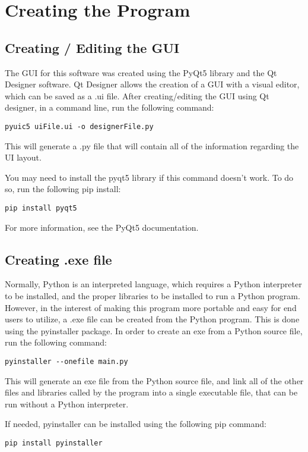 \documentclass{article}
\begin{document}
\section{Creating the Program}
\subsection{Creating / Editing the GUI}
The GUI for this software was created using the PyQt5 library and the Qt Designer software. Qt Designer allows the creation of a GUI with a visual editor, which can be saved as a .ui file. After creating/editing the GUI using Qt designer, in a command line, run the following command:
\begin{lstlisting}
pyuic5 uiFile.ui -o designerFile.py
\end{lstlisting}
This will generate a .py file that will contain all of the information regarding the UI layout. 

You may need to install the pyqt5 library if this command doesn't work. To do so, run the following pip install:
\begin{lstlisting}
pip install pyqt5
\end{lstlisting}

For more information, see the PyQt5 documentation. 

\subsection{Creating .exe file}
Normally, Python is an interpreted language, which requires a Python interpreter to be installed, and the proper libraries to be installed to run a Python program. However, in the interest of making this program more portable and easy for end users to utilize, a .exe file can be created from the Python program. This is done using the pyinstaller package. In order to create an exe from a Python source file, run the following command:
\begin{lstlisting}
pyinstaller --onefile main.py
\end{lstlisting}
This will generate an exe file from the Python source file, and link all of the other files and libraries called by the program into a single executable file, that can be run without a Python interpreter. 

If needed, pyinstaller can be installed using the following pip command:
\begin{lstlisting}
pip install pyinstaller
\end{lstlisting}
\end{document}
